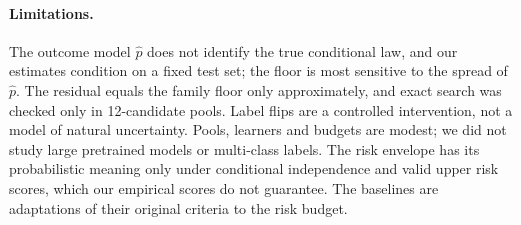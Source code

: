 \documentclass[runningheads]{llncs}
\begin{document}
\paragraph{Limitations.} The outcome model $\hat p$ does not identify the true conditional law, and our estimates condition on a fixed test set; the floor is most sensitive to the spread of $\hat p$. The residual equals the family floor only approximately, and exact search was checked only in 12-candidate pools. Label flips are a controlled intervention, not a model of natural uncertainty. Pools, learners and budgets are modest; we did not study large pretrained models or multi-class labels. The risk envelope has its probabilistic meaning only under conditional independence and valid upper risk scores, which our empirical scores do not guarantee. The baselines are adaptations of their original criteria to the risk budget.



\end{document}
